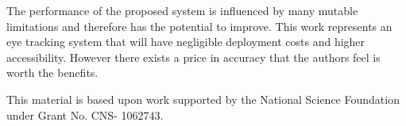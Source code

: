 \documentclass[annual]{acmsiggraph}
\begin{document}
The performance of the proposed system is influenced by many mutable
limitations and therefore has the potential to improve. This work represents an
eye tracking system that will have negligible deployment costs and higher
accessibility. However there exists a price in accuracy that the authors feel
is worth the benefits.

This material is based upon work supported by the National Science Foundation
under Grant No. CNS- 1062743.



\end{document}
